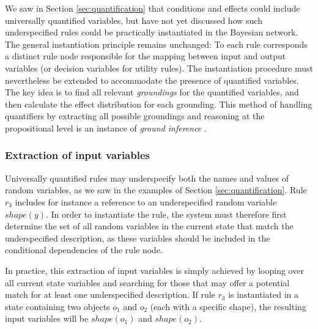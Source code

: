 We saw in Section \ref{sec:quantification} that conditions and effects could include universally quantified variables, but have not yet discussed how such underspecified rules could be practically instantiated in the Bayesian network. The general instantiation principle remains unchanged: To each rule corresponds a distinct rule node responsible for the mapping between input and output variables (or decision variables for utility rules). The instantiation procedure must nevertheless be extended to accommodate the presence of quantified variables.  The key idea is to find all relevant \textit{groundings} for the quantified variables, and then calculate the effect distribution for each grounding. This method of handling quantifiers by extracting all possible groundings and reasoning at the propositional level is an instance of \textit{ground inference} \citep{getoor:srlbook07}. 

\subsubsection*{Extraction of input variables}

Universally quantified rules may underspecify both the names and values of random variables, as we saw in the examples of Section \ref{sec:quantification}.  Rule $r_3$ includes for instance a reference to an underspecified random variable $\mathit{shape}(y)$.  In order to instantiate the rule, the system must therefore first determine the set of all random variables in the current state that match the underspecified description, as these variables should be included in the conditional dependencies of the rule node. 

In practice, this extraction of input variables is simply achieved by looping over all current state variables and searching for those that may offer a potential match for at least one underspecified description. If rule $r_3$ is instantiated in a state containing two objects $o_1$ and $o_2$ (each with a specific shape), the resulting input variables will be $\mathit{shape}(o_1)$ and $\mathit{shape}(o_2)$. 


